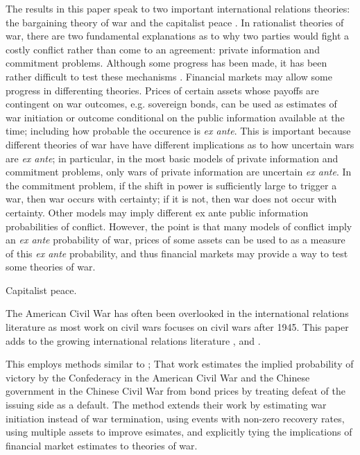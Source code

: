 \documentclass[11pt, oneside, article]{memoir}\usepackage[]{graphicx}\usepackage[]{color}
\begin{document}
The results in this paper speak to two important international relations theories: the bargaining theory of war \parencite{Fearon1995} and the capitalist peace \parencites{GartzkeLiEtAl2001a}{GartzkeLi2003}.
In rationalist theories of war, there are two fundamental explanations as to why two parties would fight a costly conflict rather than come to an agreement: private information and commitment problems.
Although some progress has been made, it has been rather difficult to test these mechanisms \parencite{Reiter2003}.
Financial markets may allow some progress in differenting theories.
Prices of certain assets whose payoffs are contingent on war outcomes, e.g. sovereign bonds, can be used as estimates of war initiation or outcome conditional on the public information available at the time; including how probable the occurence is \textit{ex ante}.
This is important because different theories of war have have different implications as to how uncertain wars are \textit{ex ante}; in particular, in the most basic models of private information and commitment problems, only wars of private information are uncertain \textit{ex ante}.
In the commitment problem, if the shift in power is sufficiently large to trigger a war, then war occurs with certainty; if it is not, then war does not occur with certainty.
Other models may imply different ex ante public information probabilities of conflict.
However, the point is that many models of conflict imply an \textit{ex ante} probability of war, prices of some assets can be used to as a measure of this \textit{ex ante} probability, and thus financial markets may provide a way to test some theories of war.

Capitalist peace.

The American Civil War has often been overlooked in the international relations literature as most work on civil wars focuses on civil wars after 1945.
This paper adds to the growing international relations literature \textcite{Owen2000}, and \textcite{Reiter2009}.

This employs methods similar to \cite{HaberEtAl2012};
That work estimates the implied probability of victory by the Confederacy in the American Civil War and the Chinese government in the Chinese Civil War from bond prices by treating defeat of the issuing side as a default.
The method extends their work by estimating war initiation instead of war termination, using events with non-zero recovery rates, using multiple assets to improve esimates, and explicitly tying the implications of financial market estimates to theories of war.
\end{document}
